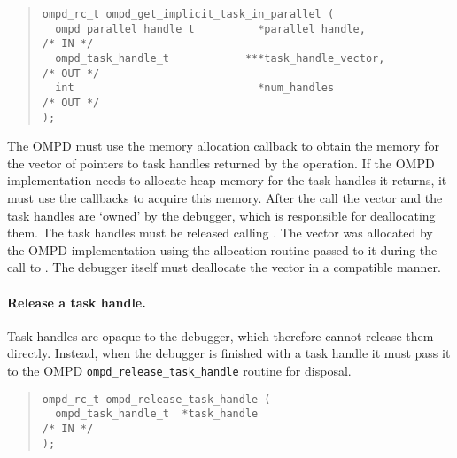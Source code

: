\begin{quote}
\begin{lstlisting}
ompd_rc_t ompd_get_implicit_task_in_parallel (
  ompd_parallel_handle_t          *parallel_handle,                 /* IN */
  ompd_task_handle_t            ***task_handle_vector,             /* OUT */
  int                             *num_handles                     /* OUT */
);
\end{lstlisting}
\end{quote}
The OMPD must use the memory allocation callback to obtain the
memory for the vector of pointers to task handles returned by the operation.
If the OMPD implementation needs to allocate heap memory for the
task handles it returns, it must use the callbacks to acquire this memory.
After the call the vector and the task handles are `owned' by the debugger,
which is responsible for deallocating them.
The task handles must be released calling
.
The vector was allocated by the OMPD implementation using the
allocation routine passed to it during the call to
.
The debugger itself must deallocate the vector in a compatible manner.

\paragraph{Release a task handle.}
Task handles are opaque to the debugger, which therefore cannot release
them directly.
Instead, when the debugger is finished with a task handle it must
pass it to the OMPD \texttt{ompd\_release\_task\_handle} routine
for disposal.
\begin{quote}
\begin{lstlisting}
ompd_rc_t ompd_release_task_handle (
  ompd_task_handle_t  *task_handle                                  /* IN */
);
\end{lstlisting}
\end{quote}


